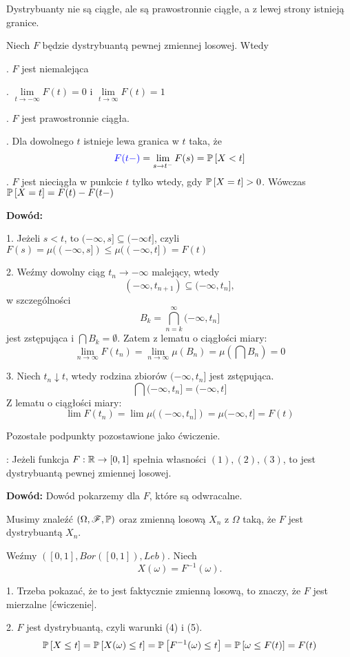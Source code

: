 Dystrybuanty nie są ciągłe, ale są prawostronnie ciągłe, a z lewej strony istnieją granice.

 Niech $F$ będzie dystrybuantą pewnej zmiennej losowej. Wtedy

. $F$ jest niemalejąca

. $\lim\limits_{t\to-\infty}F(t)=0$ i $\lim\limits_{t\to\infty}F(t)=1$

. $F$ jest prawostronnie ciągła.

. Dla dowolnego $t$ istnieje lewa granica w $t$ taka, że
$${\color{blue}F(t-)}=\lim\limits_{s\to t^-}F(s)=\mathbb{P}\left[X<t\right]$$
. $F$ jest nieciągła w punkcie $t$ tylko wtedy, gdy $\mathbb{P}\left[X=t\right]>0$. Wówczas $\mathbb{P}\left[X=t\right]=F(t)-F(t-)$

\textbf{Dowód:}

1. Jeżeli $s<t$, to $(-\infty, s]\subseteq(-\infty t]$, czyli $F(s)=\mu((-\infty,s])\leq\mu((-\infty,t])=F(t)$

2. Weźmy dowolny ciąg $t_n\to-\infty$ malejący, wtedy
$$(-\infty, t_{n+1})\subseteq(-\infty,t_n],$$
w szczególności
$$B_k=\bigcap\limits_{n=k}^\infty(-\infty,t_n]$$
jest zstępująca i $\bigcap B_k=\emptyset$. Zatem z lematu o ciągłości miary:
$$\lim\limits_{n\to\infty}F(t_n)=\lim\limits_{n\to\infty}\mu(B_n)=\mu(\bigcap B_n)=0$$

3. Niech $t_n\downarrow t$, wtedy rodzina zbiorów $(-\infty, t_n]$ jest zstępująca. 
$$\bigcap (-\infty, t_n]=(-\infty, t]$$
Z lematu o ciągłości miary:
$$\lim F(t_n)=\lim \mu((-\infty, t_n])=\mu(-\infty, t]=F(t)$$

Pozostałe podpunkty pozostawione jako ćwiczenie.
\medskip

: Jeżeli funkcja $F:\mathbb{R}\to[0,1]$ spełnia własności $(1), (2), (3)$, to jest dystrybuantą pewnej zmiennej losowej.

\textbf{Dowód:} Dowód pokarzemy dla $F$, które są odwracalne.

Musimy znaleźć $(\Omega,\mathcal{F},\mathbb{P})$ oraz zmienną losową $X_n$ z $\Omega$ taką, że $F$ jest dystrybuantą $X_n$.

Weźmy $([0,1],Bor([0,1]), Leb)$. Niech 
$$X(\omega)=F^{-1}(\omega).$$

1. Trzeba pokazać, że to jest faktycznie zmienną losową, to znaczy, że $F$ jest mierzalne [ćwiczenie].

2. $F$ jest dystrybuantą, czyli warunki (4) i (5).
\begin{align*}
    \mathbb{P}\left[X\leq t\right]=\mathbb{P}\left[X(\omega)\leq t\right]=\mathbb{P}\left[F^{-1}(\omega)\leq t\right]=\mathbb{P}\left[\omega\leq F(t)\right]=F(t)
\end{align*}